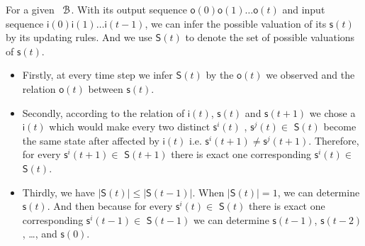 For a given \BCN\  ${\mathcal{B}}$. With its output sequence $\mathsf{o}(0)\mathsf{o}(1)\ldots\mathsf{o}(t)$ and input sequence $\mathsf{i}(0)\mathsf{i}(1)\ldots\mathsf{i}(t-1)$, we can infer the possible valuation of its $\mathsf{s}(t)$ by its updating rules. And  we use $\mathsf{S}(t)$ to denote the set of possible valuations of $\mathsf{s}(t)$. 
\begin{itemize}
	\item  Firstly, at every time step we infer $\mathsf{S}(t)$ by the $\mathsf{o}(t)$ we observed and the relation $\mathsf{o}(t)$ between $\mathsf{s}(t)$.
	\item Secondly, according to the relation of $\mathsf{i}(t)$, $\mathsf{s}(t)$ and $\mathsf{s}(t+1)$ we chose a $\mathsf{i}(t)$ which would make every two distinct $\mathsf{s}^{i}(t)$ , $\mathsf{s}^{j}(t)$$\in$ $\mathsf{S}(t)$ become the same state after affected by $\mathsf{i}(t)$ i.e. $\mathsf{s}^{i}(t+1)\ne\mathsf{s}^{j}(t+1)$. Therefore, for every $\mathsf{s}^{i}(t+1)\in $ $\mathsf{S}(t+1)$ there is exact one corresponding $\mathsf{s}^{i}(t)\in $ $\mathsf{S}(t)$.
	\item Thirdly, we have $|$$\mathsf{S}(t)$$|\le|$$\mathsf{S}(t-1)$$|$. When $|$$\mathsf{S}(t)$$|=1$, we can determine $\mathsf{s}(t)$. And then because for every $\mathsf{s}^{i}(t)\in $ $\mathsf{S}(t)$ there is exact one corresponding $\mathsf{s}^{i}(t-1)\in $ $\mathsf{S}(t-1)$ we can determine $\mathsf{s}(t-1)$, $\mathsf{s}(t-2)$, \ldots, and $\mathsf{s}(0)$.
\end{itemize}

\begin{comment}
 The input \Input$(t)$ we chose should make every two distinct states \State$^{i}(t)$ , \State$^{j}(t)$$\in$ \Ustate$(t)$ will not turn into be the same state after affected by \Input$(t)$.  \ly{Therefore,   there is exact one $s\in $ \Ustate$(t)$ such that $s\xrightarrow
{i(t)} s_1$ for each $s_1\in $ \Ustate$(t+1)$.} And the \Ustate$(t+1)$ is derived by the input \Input$(t)$ and \Output$(t+1)$, and we have $|$\Ustate$(t+1)$$|\le|$\Ustate$(t)$$|$. If $|$\Ustate$(t+1)$$|=1$,  we can determine \State$(t+1)$.  Employing the update rules and \Input$(t)$, we can determine the  \State$(t)$.  Repeating this step, we  determine the initial state \State$(0)$ of the \BCN.
\end{comment}

\begin{comment} 
 But we can also determine the set of possible initial states \Ustate$(0)$ by initial output \Output$(0)$ we observe, and then we can use different input sequences (\Input$^{1}(0)$\Input$^{1}(1)\ldots$\Input$^{1}(k)$, \Input$^{2}(0)$\Input$^{2}(1)\ldots$\Input$^{2}(k)$, $\ldots$) to determine initial state for different sets of possible initial states (\Ustate$^{1}(0)$, \Ustate$^{2}(0)$, $\ldots$). In this case, the requirements for \BCNs\ to determine the initail state would be easier to satisfy. 
\end{comment}

